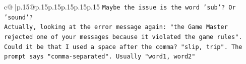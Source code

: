 \documentclass{article}
\begin{document}
{\begin{supertabular}{c@{$\;$}|p{.15\linewidth}@{}p{.15\linewidth}p{.15\linewidth}p{.15\linewidth}p{.15\linewidth}p{.15\linewidth}}
{{{\texttt{Maybe the issue is the word 'sub'? Or 'sound'?} \\
\texttt{Actually, looking at the error message again: "the Game Master rejected one of your messages because it violated the game rules".} \\
\texttt{Could it be that I used a space after the comma? "slip, trip". The prompt says "comma{-}separated". Usually "word1, word2"} \\
            }
        }
    }
     \\ \\

\end{supertabular}
}
\end{document}
